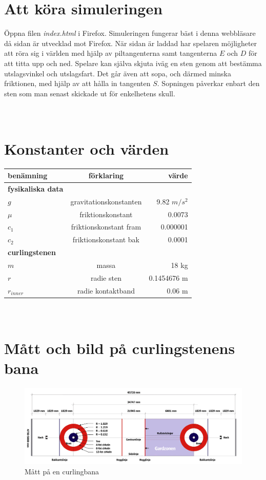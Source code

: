\documentclass[11pt]{article} %
\begin{document}
\section{Att köra simuleringen}
Öppna filen \emph{index.html} i Firefox. Simuleringen fungerar bäst i denna webbläsare då sidan är utvecklad mot Firefox. När sidan är laddad har spelaren möjligheter att röra sig i världen med hjälp av piltangenterna samt tangenterna $E$ och $D$ för att titta upp och ned. Spelare kan själva skjuta iväg en sten genom att bestämma utslagsvinkel och utslagsfart. Det går även att sopa, och därmed minska friktionen, med hjälp av att hålla in tangenten $S$. Sopningen påverkar enbart den sten som man senast skickade ut för enkelhetens skull. 


\pagebreak
\appendix
\section{\\Konstanter och värden} \label{App:AppendixA}


\begin{tabular}{l | c | r}
benämning & förklaring & värde \\ \hline\hline
\textbf{fysikaliska data} & & \\ \hline
$g$ & gravitationskonstanten & 9.82 $m/s^2$\\
$\mu$ & friktionskonstant & 0.0073\\
$c_1$ & friktionskonstant fram & 0.000001\\
$c_2$ & friktionskonstant bak & 0.0001\\
\textbf{curlingstenen} & & \\ \hline
$m$ & massa & 18 kg\\
$r$ & radie sten & 0.1454676 m\\
$r_{inner}$ & radie kontaktband & 0.06 m\\ \hline
\end{tabular}

\section{\\Mått och bild på curlingstenens bana} \label{App:AppendixB}

\begin{figure}[ht!]
\centering
\includegraphics[width=160mm]{curlingbana.jpg}
\caption{Mått på en curlingbana}
\label{fig:curlbana_riktigt}
\label{overflow}
\end{figure}
\end{document}
